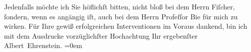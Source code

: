 \begin{ledgroupsized}[t]{13cm}
           \pstart
           Jedenfalls möchte ich Sie höflichſt {\pb}bitten, nicht bloß
                    bei dem Herrn Fiſcher, ſondern, wenn es
                    angängig iſt, auch bei dem Herrn Profeſſor Bie für mich zu wirken.\pend
           \pstart
           Für Ihre gewiß erfolgreichen Interventionen im Voraus dankend, bin ich mit dem
                    Ausdrucke vorzüglichſter Hochachtung \pend
           \pstart
           Ihr ergebenſter{\\[\baselineskip]}\spacefill\mbox{Albert Ehrenstein.}\pend
           \leftskip=0em{}
         
         \endnumbering{}\end{ledgroupsized}  \newcommand{\dateiname}{L01887}\newcommand{\titel}{Albert Ehrenstein an Arthur Schnitzler, 22. 11. 1909}\newcommand{\editorInnen}{Martin Anton Müller und Gerd-Hermann Susen}
      